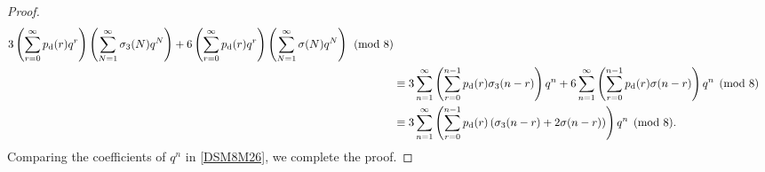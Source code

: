 \documentclass[10pt,a4paper]{amsart}
\begin{document}
\begin{proof}
\begin{align}
3
\left(
\sum_{r=0}^{\infty}p_{\mathrm d}(r)q^r
\right)
\left(
\sum_{N=1}^{\infty}\sigma_3(N)q^N
\right)+
6
\left(
\sum_{r=0}^{\infty}p_{\mathrm d}(r)q^r
\right)
\left(
\sum_{N=1}^{\infty}\sigma(N)q^N
\right)
\pmod8
\notag\\
&\equiv
3\sum_{n=1}^{\infty}
\left(
\sum_{r=0}^{n-1}
p_{\mathrm d}(r)\sigma_3(n-r)
\right)q^n+
6\sum_{n=1}^{\infty}
\left(
\sum_{r=0}^{n-1}
p_{\mathrm d}(r)\sigma(n-r)
\right)q^n
\pmod8
\notag\\
&\label{DSM8M26}\equiv
3\sum_{n=1}^{\infty}
\left(
\sum_{r=0}^{n-1}
p_{\mathrm d}(r)
\left(
\sigma_3(n-r)+2\sigma(n-r)
\right)
\right)q^n
\pmod8.
\end{align}
Comparing the coefficients of $q^n$ in \eqref{DSM8M26}, we complete the proof.
\end{proof}
\end{document}
